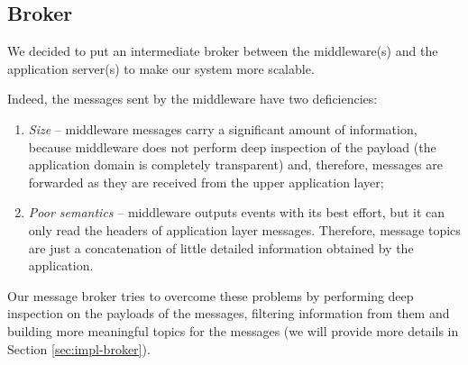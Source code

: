\subsection{Broker}

We decided to put an intermediate broker between the middleware(s) and the
application server(s) to make our system more scalable.

Indeed, the messages sent by the middleware have two deficiencies:

\begin{enumerate}
  \item \textit{Size} -- middleware messages carry a significant amount of
    information, because middleware does not perform deep inspection of the
    payload (the application domain is completely transparent) and, therefore,
    messages are forwarded as they are received from the upper application
    layer;
  \item \textit{Poor semantics} -- middleware outputs events with its best
    effort, but it can only read the headers of application layer messages.
    Therefore, message topics are just a concatenation of little detailed
    information obtained by the application.
\end{enumerate}

Our message broker tries to overcome these problems by performing deep
inspection on the payloads of the messages, filtering information from them and
building more meaningful topics for the messages (we will provide more details
in Section \ref{sec:impl-broker}).


